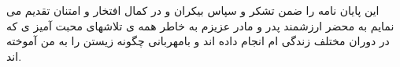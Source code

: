 \begin{acknowledgementpage}

\vspace{1.5cm}

{\nastaliq
{
این پایان نامه را ضمن تشکر و سپاس بیکران و در کمال افتخار و امتنان تقدیم می نمایم به محضر ارزشمند پدر و مادر عزیزم به خاطر همه ی تلاشهای محبت آمیز ی که در دوران مختلف زندگی ام انجام داده اند و بامهربانی چگونه زیستن را به من آموخته اند.
}}\end{acknowledgementpage}
\newpage